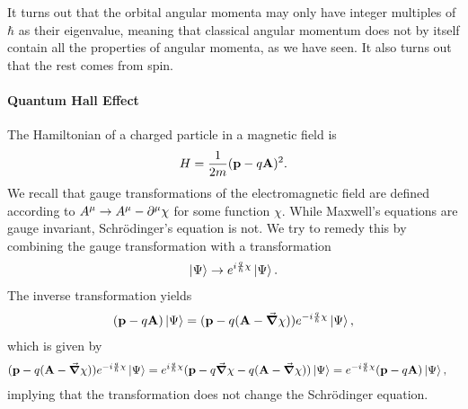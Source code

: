 It turns out that the orbital angular momenta may only have integer multiples of $\hbar$ as their eigenvalue, meaning that classical angular momentum does not by itself contain all the properties of angular momenta, as we have seen. It also turns out that the rest comes from spin.

\paragraph{Quantum Hall Effect}
The Hamiltonian of a charged particle in a magnetic field is
\begin{align*}
	H = \frac{1}{2m}(\vb{p} - q\vb{A})^{2}.
\end{align*}
We recall that gauge transformations of the electromagnetic field are defined according to $A^{\mu} \to A^{\mu} - \del[\mu]{}{\chi}$ for some function $\chi$. While Maxwell's equations are gauge invariant, Schrödinger's equation is not. We try to remedy this by combining the gauge transformation with a transformation
\begin{align*}
	\ket{\Psi} \to e^{i\frac{q}{\hbar}\chi}\ket{\Psi}.
\end{align*}
The inverse transformation yields
\begin{align*}
	(\vb{p} - q\vb{A})\ket{\Psi} = (\vb{p} - q(\vb{A} - \grad{\chi}))e^{-i\frac{q}{\hbar}\chi}\ket{\Psi},
\end{align*}
which is given by
\begin{align*}
	(\vb{p} - q(\vb{A} - \grad{\chi}))e^{-i\frac{q}{\hbar}\chi}\ket{\Psi} &= e^{i\frac{q}{\hbar}\chi}(\vb{p} - q\grad{\chi} - q(\vb{A} - \grad{\chi}))\ket{\Psi} = e^{-i\frac{q}{\hbar}\chi}(\vb{p} - q\vb{A})\ket{\Psi},
\end{align*}
implying that the transformation does not change the Schrödinger equation.

